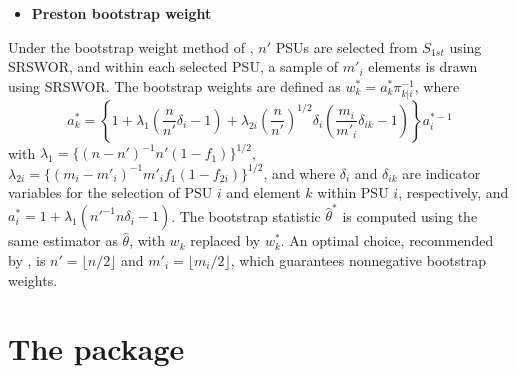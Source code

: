 \begin{itemize}
\tightlist
\item
  \textbf{Preston bootstrap weight}
\end{itemize}

\noindent Under the bootstrap weight method of \citet{Preston:2009}, \(n'\) PSUs are selected from \(\textrm{$S$}_{1st}\) using SRSWOR, and within each selected PSU, a sample of \(m'_i\) elements is drawn using SRSWOR. The bootstrap weights are defined as \(w_k^* = a_k^* \pi_{k|i}^{-1}\), where
\[
    a_k^* = \left\{1 + \lambda_1 \left(\frac{n}{n'} \delta_i - 1\right) 
            + \lambda_{2i} \left(\frac{n}{n'}\right)^{1/2} \delta_i \left( \frac{m_i}{m'_i} \delta_{ik} - 1                 \right)\right\} a_i^{*-1}
\]
with \(\lambda_1 = \{(n-n')^{-1} n'(1-f_1)\}^{1/2}\), \(\lambda_{2i} = \{(m_i - m'_i)^{-1} m'_i f_1 (1-f_{2i})\}^{1/2}\), and where \(\delta_i\) and \(\delta_{ik}\) are indicator variables for the selection of PSU \(i\) and element \(k\) within PSU \(i\), respectively, and \(a_i^* = 1 + \lambda_1(n'^{-1} n \delta_i - 1)\). The bootstrap statistic \(\hat{\theta}^*\) is computed using the same estimator as \(\hat{\theta}\), with \(w_k\) replaced by \(w_k^*\). An optimal choice, recommended by \citet{Preston:2009}, is \(n' = \lfloor n/2 \rfloor\) and \(m'_i = \lfloor m_i/2 \rfloor\), which guarantees nonnegative bootstrap weights.

\section{\texorpdfstring{The  package}{The  package}}\label{sec:pkgbootsurv}

